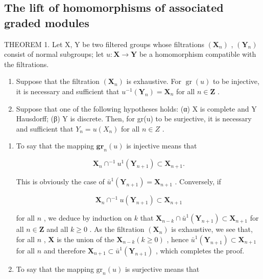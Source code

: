 \subsection{The lift of homomorphisms of associated graded modules}

THEOREM 1. Let X, Y be two filtered groups whose filtrations \((\mathbf{X}_n)\) , \((\mathbf{Y}_n)\) consist of normal subgroups; let \(u: \mathbf{X} \to \mathbf{Y}\) be a homomorphism compatible with the filtrations.

\begin{enumerate}
\def\labelenumi{(\roman{enumi})}
\item
  Suppose that the filtration \((\mathbf{X}_n)\) is exhaustive. For \(\operatorname{gr}(u)\) to be injective, it is necessary and sufficient that \(u^{-1}(\mathbf{Y}_n) = \mathbf{X}_n\) for all \(n \in \mathbf{Z}\) .
\item
  Suppose that one of the following hypotheses holds: (α) X is complete and Y Hausdorff; (β) Y is discrete. Then, for gr(u) to be surjective, it is necessary and sufficient that \(Y_{n} = u(X_{n})\) for all \(n \in Z\) .
\end{enumerate}

\begin{enumerate}
\def\labelenumi{(\roman{enumi})}
\tightlist
\item
  To say that the mapping \(\mathbf{gr}_n(u)\) is injective means that

\[
\mathbf {X} _ {n} \cap^ {- 1} u ^ {1} (\mathbf {Y} _ {n + 1}) \subset \mathbf {X} _ {n + 1}.
\]

This is obviously the case of \(\bar{u}^1 (\mathbf{Y}_{n + 1}) = \mathbf{X}_{n + 1}\) . Conversely, if

\[
\mathbf {X} _ {n} \cap^ {- 1} u (\mathbf {Y} _ {n + 1}) \subset \mathbf {X} _ {n + 1}
\]

for all \(n\) , we deduce by induction on \(k\) that \(\mathbf{X}_{n-k} \cap \bar{u}^1(\mathbf{Y}_{n+1}) \subset \mathbf{X}_{n+1}\) for all \(n \in \mathbf{Z}\) and all \(k \geqslant 0\) . As the filtration \((\mathbf{X}_n)\) is exhaustive, we see that, for all \(n\) , \(\mathbf{X}\) is the union of the \(\mathbf{X}_{n-k} (k \geqslant 0)\) , hence \(\bar{u}^1(\mathbf{Y}_{n+1}) \subset \mathbf{X}_{n+1}\) for all \(n\) and therefore \(\mathbf{X}_{n+1} \subset \bar{u}^1(\mathbf{Y}_{n+1})\) , which completes the proof.

\item
  To say that the mapping \(\mathrm{gr}_n(u)\) is surjective means that
\end{enumerate}

